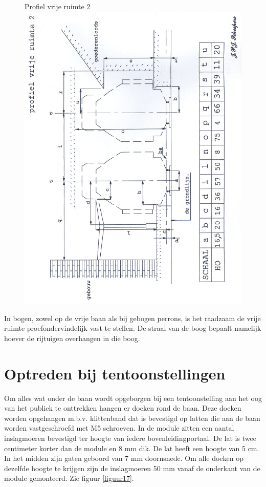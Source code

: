 \documentclass[12pt,a4paper]{report}
\begin{document}
\begin{figure}[ht]
  \captionbox
  {Profiel vrije ruimte 2\label{figuur16}}
  {\includegraphics[scale=0.9]{images/rcu_figuur16}}
\end{figure}

In bogen, zowel op de vrije baan als bij gebogen perrons, is het raadzaam de vrije ruimte proefondervindelijk vast te stellen. De straal van de boog bepaalt namelijk hoever de rijtuigen overhangen in die boog.

\section{Optreden bij tentoonstellingen}

Om alles wat onder de baan wordt opgeborgen bij een tentoonstelling aan het oog van het publiek te onttrekken hangen er doeken rond de baan. Deze doeken worden opgehangen m.b.v. klittenband dat is bevestigd op latten die aan de baan worden vastgeschroefd met M5 schroeven. In de module zitten een aantal inslagmoeren bevestigd ter hoogte van iedere bovenleidingportaal. De lat is twee centimeter korter dan de module en 8 mm dik. De lat heeft een hoogte van 5 cm. In het midden zijn gaten geboord van 7 mm doornsnede. Om alle doeken op dezelfde hoogte te krijgen zijn de inslagmoeren 50 mm vanaf de onderkant van de module gemonteerd. Zie figuur \ref{figuur17}.
\end{document}
